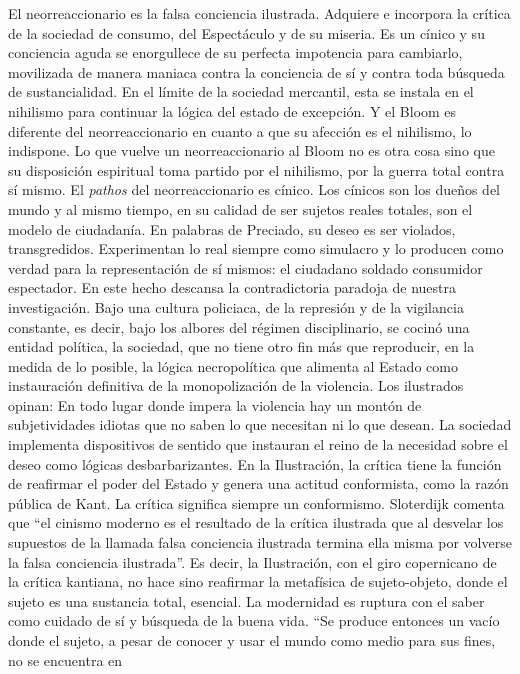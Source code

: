 \documentclass[
]{article}
\begin{document}
El neorreaccionario es la falsa conciencia ilustrada. Adquiere e
incorpora la crítica de la sociedad de consumo, del Espectáculo y de su
miseria. Es un cínico y su conciencia aguda se enorgullece de su
perfecta impotencia para cambiarlo, movilizada de manera maniaca contra
la conciencia de sí y contra toda búsqueda de sustancialidad. En el
límite de la sociedad mercantil, esta se instala en el nihilismo para
continuar la lógica del estado de excepción. Y el Bloom es diferente del
neorreaccionario en cuanto a que su afección es el nihilismo, lo
indispone. Lo que vuelve un neorreaccionario al Bloom no es otra cosa
sino que su disposición espiritual toma partido por el nihilismo, por la
guerra total contra sí mismo. El \emph{pathos} del neorreaccionario es
cínico. Los cínicos son los dueños del mundo y al mismo tiempo, en su
calidad de ser sujetos reales totales, son el modelo de ciudadanía. En
palabras de Preciado, su deseo es ser violados, transgredidos.
Experimentan lo real siempre como simulacro y lo producen como verdad
para la representación de sí mismos: el ciudadano soldado consumidor
espectador. En este hecho descansa la contradictoria paradoja de nuestra
investigación. Bajo una cultura policiaca, de la represión y de la
vigilancia constante, es decir, bajo los albores del régimen
disciplinario, se cocinó una entidad política, la sociedad, que no tiene
otro fin más que reproducir, en la medida de lo posible, la lógica
necropolítica que alimenta al Estado como instauración definitiva de la
monopolización de la violencia. Los ilustrados opinan: En todo lugar
donde impera la violencia hay un montón de subjetividades idiotas que no
saben lo que necesitan ni lo que desean. La sociedad implementa
dispositivos de sentido que instauran el reino de la necesidad sobre el
deseo como lógicas desbarbarizantes. En la Ilustración, la crítica tiene
la función de reafirmar el poder del Estado y genera una actitud
conformista, como la razón pública de Kant. La crítica significa siempre
un conformismo. Sloterdijk comenta que ``el cinismo moderno es el
resultado de la crítica ilustrada que al desvelar los supuestos de la
llamada falsa conciencia ilustrada termina ella misma por volverse la
falsa conciencia ilustrada''. Es decir, la Ilustración, con el giro
copernicano de la crítica kantiana, no hace sino reafirmar la metafísica
de sujeto-objeto, donde el sujeto es una sustancia total, esencial. La
modernidad es ruptura con el saber como cuidado de sí y búsqueda de la
buena vida. ``Se produce entonces un vacío donde el sujeto, a pesar de
conocer y usar el mundo como medio para sus fines, no se encuentra en
\end{document}
